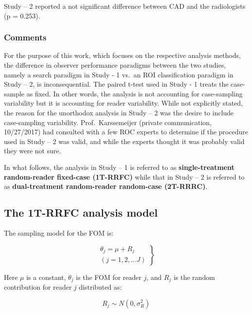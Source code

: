 \documentclass[
]{book}
\begin{document}
Study -- 2 reported a not significant difference between CAD and the radiologists (p = 0.253).

\hypertarget{standalone-cad-radiologists-comments}{%
\subsubsection{Comments}\label{standalone-cad-radiologists-comments}}

For the purpose of this work, which focuses on the respective analysis methods, the difference in observer performance paradigms between the two studies, namely a search paradigm in Study - 1 vs.~an ROI classification paradigm in Study -- 2, is inconsequential. The paired t-test used in Study - 1 treats the case-sample as fixed. In other words, the analysis is not accounting for case-sampling variability but it is accounting for reader variability. While not explicitly stated, the reason for the unorthodox analysis in Study -- 2 was the desire to include case-sampling variability. Prof.~Karssemeijer (private communication, 10/27/2017) had consulted with a few ROC experts to determine if the procedure used in Study -- 2 was valid, and while the experts thought it was probably valid they were not sure.

In what follows, the analysis in Study -- 1 is referred to as \textbf{single-treatment random-reader fixed-case (1T-RRFC)} while that in Study -- 2 is referred to as \textbf{dual-treatment random-reader random-case (2T-RRRC)}.

\hypertarget{the-1t-rrfc-analysis-model}{%
\subsection{The 1T-RRFC analysis model}\label{the-1t-rrfc-analysis-model}}

The sampling model for the FOM is:

\begin{equation}
\left.
\begin{aligned}
\theta_j=\mu+R_j \\
\left (j = 1,2,...J  \right )
\end{aligned}
\right \}
\label{eq:standalone-1t-rrfc}
\end{equation}

Here \(\mu\) is a constant, \(\theta_j\) is the FOM for reader \(j\), and \(R_j\) is the random contribution for reader \(j\) distributed as:

\begin{equation}
R_j \sim  N\left ( 0,\sigma_R^2 \right )
\label{eq:standalone-cad-2t-rrfc-rj-sampling}
\end{equation}
\end{document}
